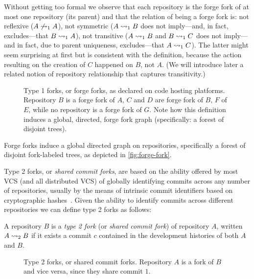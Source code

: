 \vspace{1em}

Without getting too formal we observe that each repository is the forge fork of
at most one repository (its parent) and that the relation of being a forge fork
is: not reflexive ($A\not\rightsquigarrow_1 A$), not symmetric ($A\rightsquigarrow_1 B$ does not
imply---and, in fact, excludes---that $B\rightsquigarrow_1 A$), not transitive
($A\rightsquigarrow_1 B$ and $B\rightsquigarrow_1 C$ does not imply---and in fact, due to parent
uniqueness, excludes---that $A\rightsquigarrow_1 C$).  The latter might seem surprising
at first but is consistent with the definition, because the action resulting on
the creation of $C$ happened on $B$, not $A$.  (We will introduce later a
related notion of repository relationship that captures transitivity.)

\begin{figure}[t]
  \centering
  
  \caption{Type 1 forks, or forge forks, as declared on code hosting platforms.
    Repository $B$ is a forge fork of $A$, $C$ and $D$ are forge fork of $B$,
    $F$ of $E$, while no repository is a forge fork of $G$. Note how this
    definition induces a global, directed, forge fork graph (specifically: a
    forest of disjoint trees). %
    }%
  \label{fig:forge-fork}
  \label{fig:type1-fork}
\end{figure}

Forge forks induce a global directed graph on repositories, specifically a
forest of disjoint fork-labeled trees, as depicted in \cref{fig:forge-fork}.

Type 2 forks, or \emph{shared commit forks}, are based on the ability offered
by most VCS (and all distributed VCS) of globally identifying commits across
any number of repositories, usually by the means of intrinsic commit
identifiers based on cryptographic hashes~\cite{spinellis2005vcs,
  swhipres2018}. Given the ability to identify commits across different
repositories we can define type 2 forks as follows:
\begin{definition}
  \label{def:commit-fork}
  \label{def:type2-fork}
  A repository $B$ is a \emph{type 2 fork} (or \emph{shared commit fork}) of
  repository $A$, written $A\rightsquigarrow_2 B$ if it exists a commit $c$ contained in
  the development histories of both $A$ and $B$.
\end{definition}

\begin{figure}[t]
  \centering
  
  \caption{Type 2 forks, or shared commit forks. Repository $A$ is a fork of
    $B$ and vice versa, since they share commit $1$.}%
  \label{fig:commit-fork}
  \label{fig:type2-fork}
\end{figure}

